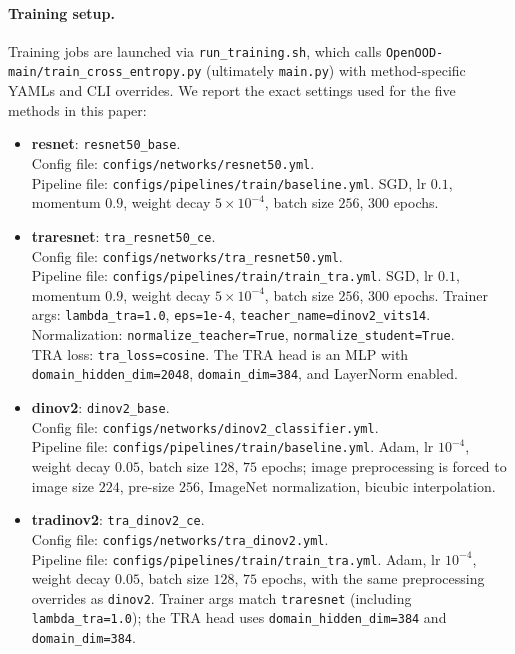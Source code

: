 \documentclass[runningheads]{llncs}
\newcommand{\code}[1]{\nolinkurl{#1}}
\begin{document}
\paragraph{Training setup.}
Training jobs are launched via \code{run_training.sh}, which calls
\code{OpenOOD-main/train_cross_entropy.py} (ultimately \code{main.py}) with method-specific
YAMLs and CLI overrides.
We report the exact settings used for the five methods in this paper:
\begin{itemize}
  \item \textbf{resnet}: \code{resnet50_base}.\\
  Config file: \code{configs/networks/resnet50.yml}.\\
  Pipeline file: \code{configs/pipelines/train/baseline.yml}.
  SGD, lr $0.1$, momentum $0.9$, weight decay $5\times 10^{-4}$,
  batch size $256$, $300$ epochs.

  \item \textbf{traresnet}: \code{tra_resnet50_ce}.\\
  Config file: \code{configs/networks/tra_resnet50.yml}.\\
  Pipeline file: \code{configs/pipelines/train/train_tra.yml}.
  SGD, lr $0.1$, momentum $0.9$, weight decay $5\times 10^{-4}$,
  batch size $256$, $300$ epochs.
  Trainer args: \code{lambda_tra=1.0}, \code{eps=1e-4}, \code{teacher_name=dinov2_vits14}.\\
  Normalization: \code{normalize_teacher=True}, \code{normalize_student=True}.\\
  TRA loss: \code{tra_loss=cosine}.
  The TRA head is an MLP with \code{domain_hidden_dim=2048},
  \code{domain_dim=384}, and LayerNorm enabled.

  \item \textbf{dinov2}: \code{dinov2_base}.\\
  Config file: \code{configs/networks/dinov2_classifier.yml}.\\
  Pipeline file: \code{configs/pipelines/train/baseline.yml}.
  Adam, lr $10^{-4}$, weight decay $0.05$, batch size $128$, $75$ epochs;
  image preprocessing is forced to image size $224$, pre-size $256$,
  ImageNet normalization, bicubic interpolation.

  \item \textbf{tradinov2}: \code{tra_dinov2_ce}.\\
  Config file: \code{configs/networks/tra_dinov2.yml}.\\
  Pipeline file: \code{configs/pipelines/train/train_tra.yml}.
  Adam, lr $10^{-4}$, weight decay $0.05$, batch size $128$, $75$ epochs,
  with the same preprocessing overrides as \code{dinov2}.
  Trainer args match \code{traresnet} (including \code{lambda_tra=1.0});
  the TRA head uses \code{domain_hidden_dim=384} and \code{domain_dim=384}.


\end{itemize}
\end{document}
